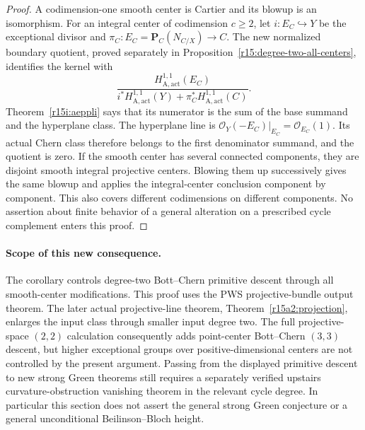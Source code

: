 \begin{proof}
A codimension-one smooth center is Cartier and its blowup
is an isomorphism.  For an integral center of codimension
$c\geq2$, let $i:E_C\hookrightarrow Y$ be the exceptional
divisor and $\pi_C:E_C=\mathbf P_C(N_{C/X})\to C$.
The new normalized boundary quotient, proved separately in
Proposition~\ref{r15:degree-two-all-centers}, identifies the kernel with
\[
 \frac{H_{\mathrm A,\mathrm{act}}^{1,1}(E_C)}
 {i^*H_{\mathrm A,\mathrm{act}}^{1,1}(Y)
                  +\pi_C^*H_{\mathrm A,\mathrm{act}}^{1,1}(C)}.
\tag{I15.21}\label{r15i:exceptional-quotient}
\]
Theorem~\ref{r15i:aeppli} says that its numerator is the
sum of the base summand and the hyperplane class.
The hyperplane line is
$\mathcal O_Y(-E_C)|_{E_C}=\mathcal O_{E_C}(1)$.
Its actual Chern class therefore belongs to the first
denominator summand, and the quotient is zero.
If the smooth center has several connected components,
they are disjoint smooth integral projective centers.
Blowing them up successively gives the same blowup and
applies the integral-center conclusion component by
component.  This also covers different codimensions on
different components.  No assertion about finite behavior
of a general alteration on a prescribed cycle complement
enters this proof.
\end{proof}

\paragraph{Scope of this new consequence.}
The corollary controls degree-two Bott--Chern primitive descent
through all smooth-center modifications. This proof uses the
PWS projective-bundle output theorem. The later actual
projective-line theorem, Theorem~\ref{r15a2:projection},
enlarges the input class through smaller input degree two.
The full projective-space $(2,2)$ calculation consequently
adds point-center Bott--Chern $(3,3)$ descent, but higher
exceptional groups over positive-dimensional centers are
not controlled by the present argument.
Passing from the displayed primitive descent to new strong
Green theorems still requires a separately verified upstairs
curvature-obstruction vanishing theorem in the relevant cycle
degree.  In particular this section does not assert the
general strong Green conjecture or a general unconditional
Beilinson--Bloch height.
